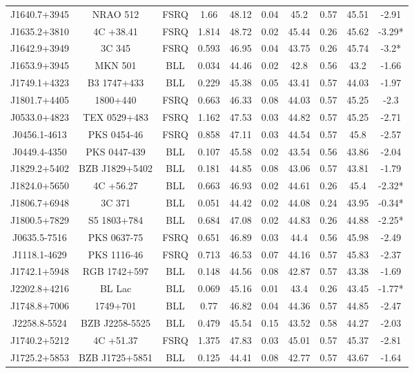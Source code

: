 \documentclass[12pt]{article}
\begin{document}
\begin{landscape}
\begin{longtable}{cccccccccc}
J1640.7+3945 & NRAO 512 & FSRQ & 1.66 & 48.12 & 0.04 & 45.2 & 0.57 & 45.51 & -2.91 \\
J1635.2+3810 & 4C +38.41 & FSRQ & 1.814 & 48.72 & 0.02 & 45.44 & 0.26 & 45.62 & -3.29* \\
J1642.9+3949 & 3C 345 & FSRQ & 0.593 & 46.95 & 0.04 & 43.75 & 0.26 & 45.74 & -3.2* \\
J1653.9+3945 & MKN 501 & BLL & 0.034 & 44.46 & 0.02 & 42.8 & 0.56 & 43.2 & -1.66 \\
J1749.1+4323 & B3 1747+433 & BLL & 0.229 & 45.38 & 0.05 & 43.41 & 0.57 & 44.03 & -1.97 \\
J1801.7+4405 & 1800+440 & FSRQ & 0.663 & 46.33 & 0.08 & 44.03 & 0.57 & 45.25 & -2.3 \\
J0533.0+4823 & TEX 0529+483 & FSRQ & 1.162 & 47.53 & 0.03 & 44.82 & 0.57 & 45.25 & -2.71 \\
J0456.1-4613 & PKS 0454-46 & FSRQ & 0.858 & 47.11 & 0.03 & 44.54 & 0.57 & 45.8 & -2.57 \\
J0449.4-4350 & PKS 0447-439 & BLL & 0.107 & 45.58 & 0.02 & 43.54 & 0.56 & 43.86 & -2.04 \\
J1829.2+5402 & BZB J1829+5402 & BLL & 0.181 & 44.85 & 0.08 & 43.06 & 0.57 & 43.81 & -1.79 \\
J1824.0+5650 & 4C +56.27 & BLL & 0.663 & 46.93 & 0.02 & 44.61 & 0.26 & 45.4 & -2.32* \\
J1806.7+6948 & 3C 371 & BLL & 0.051 & 44.42 & 0.02 & 44.08 & 0.24 & 43.95 & -0.34* \\
J1800.5+7829 & S5 1803+784 & BLL & 0.684 & 47.08 & 0.02 & 44.83 & 0.26 & 44.88 & -2.25* \\
J0635.5-7516 & PKS 0637-75 & FSRQ & 0.651 & 46.89 & 0.03 & 44.4 & 0.56 & 45.98 & -2.49 \\
J1118.1-4629 & PKS 1116-46 & FSRQ & 0.713 & 46.53 & 0.07 & 44.16 & 0.57 & 45.83 & -2.37 \\
J1742.1+5948 & RGB 1742+597 & BLL & 0.148 & 44.56 & 0.08 & 42.87 & 0.57 & 43.38 & -1.69 \\
J2202.8+4216 & BL Lac & BLL & 0.069 & 45.16 & 0.01 & 43.4 & 0.26 & 43.45 & -1.77* \\
J1748.8+7006 & 1749+701 & BLL & 0.77 & 46.82 & 0.04 & 44.36 & 0.57 & 44.85 & -2.47 \\
J2258.8-5524 & BZB J2258-5525 & BLL & 0.479 & 45.54 & 0.15 & 43.52 & 0.58 & 44.27 & -2.03 \\
J1740.2+5212 & 4C +51.37 & FSRQ & 1.375 & 47.83 & 0.03 & 45.01 & 0.57 & 45.37 & -2.81 \\
J1725.2+5853 & BZB J1725+5851 & BLL & 0.125 & 44.41 & 0.08 & 42.77 & 0.57 & 43.67 & -1.64 \\

\end{longtable}
\end{landscape}
\end{document}
